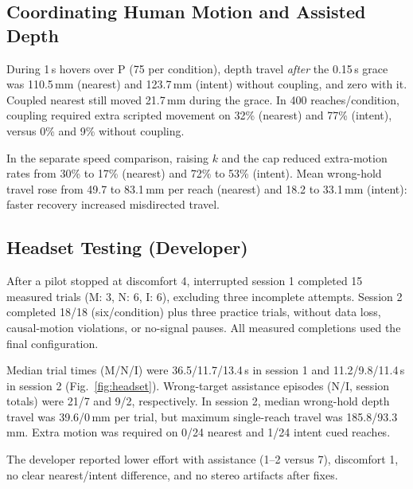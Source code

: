 \subsection{Coordinating Human Motion and Assisted Depth}
During 1\,s hovers over P (75 per condition), depth travel \emph{after} the
0.15\,s grace was 110.5\,mm (nearest) and 123.7\,mm (intent) without coupling,
and zero with it. Coupled nearest still moved 21.7\,mm during the grace.
In 400 reaches/condition, coupling required extra scripted movement on
32\% (nearest) and 77\% (intent), versus 0\% and 9\% without coupling.

In the separate speed comparison, raising $k$ and the cap reduced extra-motion
rates from 30\% to 17\% (nearest) and 72\% to 53\% (intent).
Mean wrong-hold travel rose from 49.7 to 83.1\,mm per reach (nearest) and
18.2 to 33.1\,mm (intent): faster recovery increased misdirected travel.

\subsection{Headset Testing (Developer)}
After a pilot stopped at discomfort 4, interrupted session 1 completed
15 measured trials (M: 3, N: 6, I: 6), excluding three incomplete attempts.
Session 2 completed 18/18 (six/condition) plus three practice trials, without
data loss, causal-motion violations, or no-signal pauses. All measured
completions used the final configuration.

Median trial times (M/N/I) were 36.5/11.7/13.4\,s in session 1 and
11.2/9.8/11.4\,s in session 2 (Fig.~\ref{fig:headset}). Wrong-target assistance episodes (N/I,
session totals) were 21/7 and 9/2, respectively. In session 2, median
wrong-hold depth travel was 39.6/0\,mm per trial, but maximum single-reach
travel was 185.8/93.3\,mm. Extra motion was required on 0/24 nearest and
1/24 intent cued reaches.

The developer reported lower effort with assistance (1--2 versus 7),
discomfort 1, no clear nearest/intent difference, and no stereo artifacts
after fixes.
